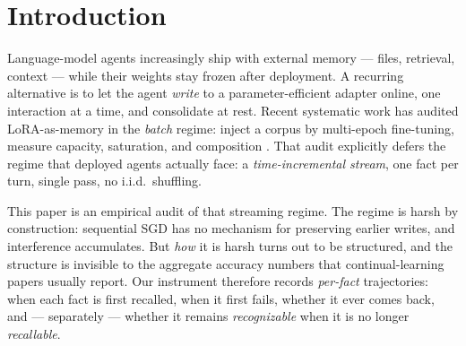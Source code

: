 \documentclass[11pt]{article}
\begin{document}
\section{Introduction}

Language-model agents increasingly ship with external memory --- files, retrieval, context --- while their
weights stay frozen after deployment. A recurring alternative is to let the agent \emph{write} to a
parameter-efficient adapter online, one interaction at a time, and consolidate at rest. Recent
systematic work has audited LoRA-as-memory in the \emph{batch} regime: inject a corpus by multi-epoch
fine-tuning, measure capacity, saturation, and composition \citep{back2026lora}. That audit explicitly
defers the regime that deployed agents actually face: a \emph{time-incremental stream}, one fact per
turn, single pass, no i.i.d.\ shuffling.

This paper is an empirical audit of that streaming regime. The regime is harsh by construction:
sequential SGD has no mechanism for preserving earlier writes, and interference accumulates. But
\emph{how} it is harsh turns out to be structured, and the structure is invisible to the aggregate
accuracy numbers that continual-learning papers usually report. Our instrument therefore records
\emph{per-fact} trajectories: when each fact is first recalled, when it first fails, whether it ever
comes back, and --- separately --- whether it remains \emph{recognizable} when it is no longer
\emph{recallable}.
\end{document}
